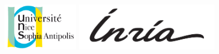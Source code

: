 \documentclass[11pt]{article}
\begin{document}

\hspace*{2.5em}\includegraphics[height=5.5em]{uns.png}
\hfill
\includegraphics[height=5.5em]{inria.png}\hspace*{2.5em}

\vspace*{2em}
\end{document}
